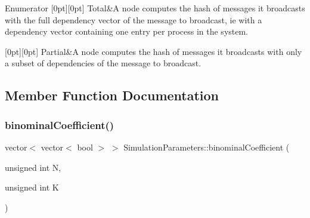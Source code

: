 \begin{DoxyEnumFields}{Enumerator}
[0pt][0pt]{}\mbox{\label{class_simulation_parameters_afb3b6aaecd4b19ef1991c870c8402dffa96b0141273eabab320119c467cdcaf17}} 
Total&A node computes the hash of messages it broadcasts with the full dependency vector of the message to broadcast, ie with a dependency vector containing one entry per process in the system. \\
\hline

[0pt][0pt]{}\mbox{\label{class_simulation_parameters_afb3b6aaecd4b19ef1991c870c8402dffa44ffd38a6dea695cbe2b34efdcc6cf27}} 
Partial&A node computes the hash of messages it broadcasts with only a subset of dependencies of the message to broadcast. \\
\hline

\end{DoxyEnumFields}


\subsection{Member Function Documentation}
\mbox{\label{class_simulation_parameters_ab0615d3df4a78df81566d219e6e9529f}} 
\subsubsection{\texorpdfstring{binominal\+Coefficient()}{binominalCoefficient()}}
{\footnotesize\ttfamily vector$<$ vector$<$ bool $>$ $>$ Simulation\+Parameters\+::binominal\+Coefficient (\begin{DoxyParamCaption}\item[{unsigned int}]{N,  }\item[{unsigned int}]{K }\end{DoxyParamCaption})\hspace{0.3cm}{\ttfamily [protected]}}

